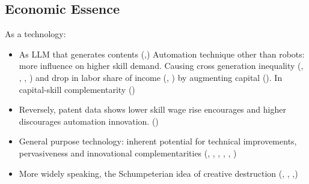 \documentclass[10pt]{article} %
\begin{document}
    \subsection{Economic Essence}
    As a technology:
    \begin{itemize}
        \item As LLM that generates contents (\cite{Feltenetal2023},\cite{Eloundouetal2023})
        Automation technique other than robots: more influence on higher skill demand. Causing cross generation inequality (\cite{KatzMurphy1992}, \cite{SachsKotlikoff2012}, \cite{HemousOlsen2022}, \cite{AcemogluRestrepo2018}) and drop in labor share of income (\cite{MookherjeeRay2022}, \cite{ShimizuMomoda2023}) by augmenting capital (\cite{Zhang2023}). In capital-skill complementarity (\cite{OhanianOrakShen2023})
        \item Reversely, patent data shows lower skill wage rise encourages and higher discourages automation innovation. (\cite{Hemousetal2019})
        \item General purpose technology: inherent potential for technical improvements, pervasiveness and innovational complementarities (\cite{BRESNAHANTrajtenberg1995}, \cite{Agrawaletal2019}, \cite{Agrawaletal2023}, \cite{GOLDFARBTaskaTeodoridis2023}, \cite{Bresnahan2023}, \cite{Eloundouetal2023})
        \item More widely speaking, the Schumpeterian idea of creative destruction (\cite{Acemoglu1998}, \cite{Acemoglu2002}, \cite{AghionAkcigitHyytinenToivanen2018},)
        
    \end{itemize}
\end{document}
